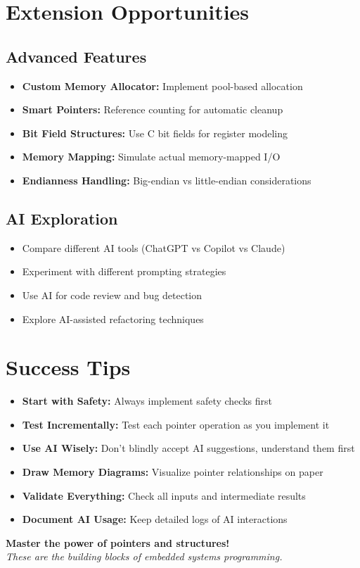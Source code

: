 \documentclass[11pt,a4paper]{article}
\begin{document}
\section{Extension Opportunities}

\subsection{Advanced Features}
\begin{itemize}
    \item \textbf{Custom Memory Allocator:} Implement pool-based allocation
    \item \textbf{Smart Pointers:} Reference counting for automatic cleanup
    \item \textbf{Bit Field Structures:} Use C bit fields for register modeling
    \item \textbf{Memory Mapping:} Simulate actual memory-mapped I/O
    \item \textbf{Endianness Handling:} Big-endian vs little-endian considerations
\end{itemize}

\subsection{AI Exploration}
\begin{itemize}
    \item Compare different AI tools (ChatGPT vs Copilot vs Claude)
    \item Experiment with different prompting strategies
    \item Use AI for code review and bug detection
    \item Explore AI-assisted refactoring techniques
\end{itemize}

\section{Success Tips}

\begin{itemize}
    \item \textbf{Start with Safety:} Always implement safety checks first
    \item \textbf{Test Incrementally:} Test each pointer operation as you implement it
    \item \textbf{Use AI Wisely:} Don't blindly accept AI suggestions, understand them first
    \item \textbf{Draw Memory Diagrams:} Visualize pointer relationships on paper
    \item \textbf{Validate Everything:} Check all inputs and intermediate results
    \item \textbf{Document AI Usage:} Keep detailed logs of AI interactions
\end{itemize}

\vspace{1cm}

\begin{center}
\textbf{Master the power of pointers and structures!}\\
\textit{These are the building blocks of embedded systems programming.}
\end{center}
\end{document}
